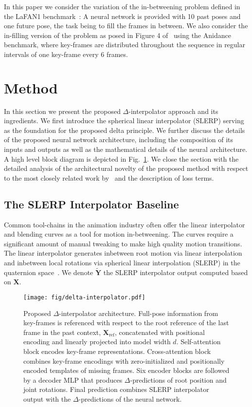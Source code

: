 \documentclass[letterpaper]{article} \usepackage[]{aaai23}  \usepackage{times}  \usepackage{helvet}  \usepackage{courier}  \usepackage[hyphens]{url}  \usepackage{graphicx} \urlstyle{rm} \def\UrlFont{\rm}  \usepackage{natbib}  \usepackage{caption} \frenchspacing  \setlength{\pdfpagewidth}{8.5in} \setlength{\pdfpageheight}{11in}
\renewcommand{\vec}[1]{\mathbf{#1}}
\begin{document}
In this paper we consider the variation of the in-betweening problem defined in the LaFAN1 benchmark~\cite{harvey2018recurrent}: A neural network is provided with 10 past poses and one future pose, the task being to fill the frames in between.
We also consider the in-filling version of the problem as posed in Figure 4 of~\citet{duan2021singleshot_arxiv} using the Anidance benchmark, where key-frames are distributed throughout the sequence in regular intervals of one key-frame every 6 frames.


\section{Method} \label{sec:method}

In this section we present the proposed $\Delta$-interpolator approach and its ingredients. We first introduce the spherical linear interpolator (SLERP) serving as the foundation for the proposed delta principle. We further discuss the details of the proposed neural network architecture, including the composition of its inputs and outputs as well as the mathematical details of the neural architecture. A high level block diagram is depicted in Fig.~\ref{fig:delta_interpolator_architecture}. We close the section with the detailed analysis of the architectural novelty of the proposed method with respect to the most closely related work by~\citet{duan2021singleshot} and the description of loss terms.

\subsection{The SLERP Interpolator Baseline}

Common tool-chains in the animation industry often offer the linear interpolator and blending curves as a tool for motion in-betweening. The curves require a significant amount of manual tweaking to make high quality motion transitions. The linear interpolator generates inbetween root motion via linear interpolation and inbetween local rotations via spherical linear interpolation (SLERP) in the quaternion space~\cite{shoemake1985animating}. We denote $\widetilde{\vec{Y}}$ the SLERP interpolator output computed based on $\vec{X}$. 

\begin{figure}[!ht]
    \centering
    \texttt{[image: fig/delta-interpolator.pdf]}
    \caption{Proposed $\Delta$-interpolator architecture. Full-pose information from key-frames is referenced with respect to the root reference of the last frame in the past context, $\vec{X}_{\textrm{ref}}$, concatenated with positional encoding and linearly projected into model width $d$. Self-attention block encodes key-frame representations. Cross-attention block combines key-frame encodings with zero-initialized and positionally encoded templates of missing frames. Six encoder blocks are followed by a decoder MLP that produces $\Delta$-predictions of root position and joint rotations. Final prediction combines SLERP interpolator output with the $\Delta$-predictions of the neural network. 
}
    \label{fig:delta_interpolator_architecture}
    \vspace{-1em}
\end{figure}
\end{document}
